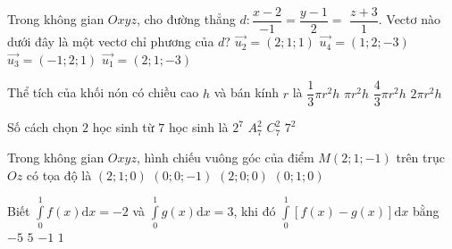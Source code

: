 \begin{ex}%
{\vspace{-0.5cm}
}

\end{ex}
\begin{ex}%
Trong không gian $O x y z$, cho đường thẳng $d\colon \dfrac{x-2}{-1}=\dfrac{y-1}{2}=$ $\dfrac{z+3}{1}$. Vectơ nào dưới đây là một vectơ chỉ phương của $d$?
\choice
{$\overrightarrow{u_2}=(2; 1; 1)$}
{$\overrightarrow{u_4}=(1; 2;-3)$}
{\True $\overrightarrow{u_3}=(-1; 2; 1)$}
{$\overrightarrow{u_1}=(2; 1;-3)$}

\end{ex}
\begin{ex}%
Thể tích của khối nón có chiều cao $h$ và bán kính $r$ là
\choice
{\True $\dfrac{1}{3} \pi r^2 h$}
{$\pi r^2 h$}
{$\dfrac{4}{3} \pi r^2 h$}
{$2\pi r^2 h$}

\end{ex}
\begin{ex}%
Số cách chọn $2$ học sinh từ $7$ học sinh là
\choice
{$2^7$}
{$A_7^2$}
{\True $C_7^2$}
{$7^2$}

\end{ex}
\begin{ex}%
Trong không gian $O x y z$, hình chiếu vuông góc của điểm $M(2; 1;-1)$ trên trục $O z$ có tọa độ là
\choice
{$(2; 1; 0)$}
{\True $(0; 0;-1)$}
{$(2; 0; 0)$}
{$(0; 1; 0)$}

\end{ex}
\begin{ex}%
Biết $\displaystyle\int\limits_0^1 f(x) \mathrm{d} x=-2$ và $\displaystyle\int\limits_0^1 g(x) \mathrm{d} x=3$, khi đó $\displaystyle\int\limits_0^1[f(x)-g(x)] \mathrm{d} x$ bằng
\choice
{\True $-5$}
{$5$}
{$-1$}
{$1$}

\end{ex}
